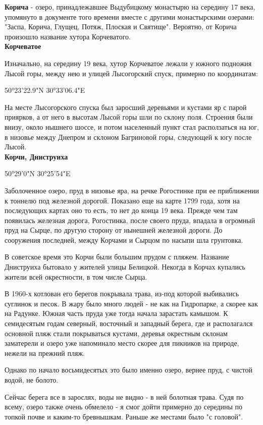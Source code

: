 \textbf{Корича} - озеро, принадлежавшее Выдубицкому монастырю на середину 17 века, упомянуто в документе того времени вместе с другими монастырскими озерами: "Заспа, Корича, Глущец, Потяж, Плоская и Святище". Вероятно, от Корича произошло название хутора Корчеватого.\\

\textbf{Корчеватое} 

Изначально, на середину 19 века, хутор Корчеватое лежали у южного подножия Лысой горы, между нею и улицей Лысогорский спуск, примерно по координатам:

50°23'22.9"N 30°33'06.4"E

На месте Лысогорского спуска был заросший деревьями и кустами яр с парой приярков, а от него в высотам Лысой горы шли по склону поля. Строения были внизу, около нышнего 
шоссе, и потом населенный пункт стал расползаться на юг, в низовье между Днепром и склоном Багриновой горы, следующей к югу после Лысой.\\

\textbf{Корчи, Дниструиха}

50°29'0"N 30°25'54"E

Заболоченное озеро, пруд в низовье яра, на речке Рогостинке при ее приближении к тоннелю под железной дорогой. Показано еще на карте 1799 года, хотя на последующих картах оно то есть, то нет до конца 19 века. Прежде чем там появилась железная дорога, Рогостинка, после своего пруда, впадала в огромный пруд на Сырце, по другую сторону от нынешней железной дороги. До сооружения последней, между Корчами и Сырцом по насыпи шла грунтовка.

В советское время это Корчи были большим прудом с пляжем. Название Дниструиха бытовало у жителей улицы Белицкой. Некогда в Корчах купались жители всей окрестности, в том числе Сырца.

В 1960-х котлован его берегов покрывала трава, из-под которой выбивались суглинок и песок. В жару было много людей - не как на Гидропарке, а скорее как на Радунке. Южная часть пруда уже тогда начала зарастать камышом. К семидесятым годам северный, восточный и западный берега, где и располагался основной пляж стали покрываться кустами, деревья окрестным склонам заматерели и озеро уже напоминало место скорее для пикников на природе, нежели на прежний пляж.

Однако по начало восьмидесятых это было именно озеро, вернее пруд, с чистой водой, не болото.

Сейчас берега все в зарослях, воды не видно - в ней болотная трава. Судя по всему, озеро также очень обмелело - я смог дойти примерно до середины по топкой почве и каким-то бревнышкам. Раньше же местами было "с головой".\\



